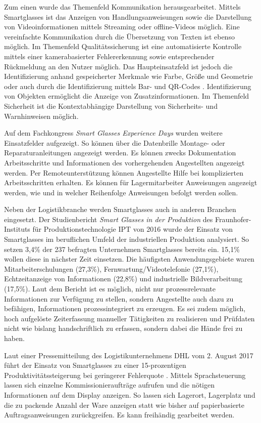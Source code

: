 Zum einen wurde das Themenfeld Kommunikation herausgearbeitet. Mittels Smartglasses ist das Anzeigen von Handlungsanweisungen sowie die Darstellung von Videoinformationen mittels Streaming oder offline-Videos möglich. Eine vereinfachte Kommunikation durch die Übersetzung von Texten ist ebenso möglich. Im Themenfeld Qualitätssicherung ist eine automatisierte Kontrolle mittels einer kamerabasierter Fehlererkennung sowie entsprechender Rückmeldung an den Nutzer möglich. Das Haupteinsatzfeld ist jedoch die Identifizierung anhand gespeicherter Merkmale wie Farbe, Größe und Geometrie oder auch durch die Identifizierung mittels Bar- und QR-Codes \cite{Niemoller2017}. Identifizierung von Objekten ermöglicht die Anzeige von Zusatzinformationen. Im Themenfeld Sicherheit ist die Kontextabhängige Darstellung von Sicherheits- und Warnhinweisen möglich. 

Auf dem Fachkongress \emph{Smart Glasses Experience Days} \cite{Manokaran-Pathamathan2017} wurden weitere Einsatzfelder aufgezeigt. So können über die Datenbrille Montage- oder Reparaturanleitungen angezeigt werden. Es können zwecks Dokumentation Arbeitsschritte und Informationen des vorhergehenden Angestellten angezeigt werden. Per Remoteunterstützung können Angestellte Hilfe bei komplizierten Arbeitsschritten erhalten. Es können für Lagermitarbeiter Anweisungen angezeigt werden, wie und in welcher Reihenfolge Anweisungen befolgt werden sollen.

Neben der Logistikbranche werden Smartglasses auch in anderen Branchen eingesetzt. Der Studienbericht \emph{Smart Glasses in der Produktion} des Fraunhofer-Instituts für Produktionstechnologie IPT von 2016 \cite{Plutz} wurde der Einsatz von Smartglasses im beruflichen Umfeld der industriellen Produktion analysiert. So setzen 3,4\% der 237 befragten Unternehmen  Smartglasses bereits ein. 15,1\% wollen diese in nächster Zeit einsetzen. Die häufigsten Anwendungsgebiete waren Mitarbeiterschulungen (27,3\%), Fernwartung/Videotelefonie (27,1\%), Echtzeitanzeige von Informationen (22,8\%) und industrielle Bildverarbeitung (17,5\%). Laut dem Bericht ist es möglich, nicht nur 
prozessrelevante Informationen zur Verfügung zu stellen, sondern Angestellte auch dazu zu befähigen, Informationen prozessintegriert zu erzeugen. Es sei zudem möglich, hoch aufgelöste Zeiterfassung manueller Tätigkeiten zu realisieren und Prüfdaten nicht wie bislang handschriftlich zu erfassen, sondern dabei die Hände frei zu haben.

Laut einer Pressemitteilung des Logistikunternehmens DHL vom 2. August 2017 führt der Einsatz von Smartglasses zu einer 15-prozentigen Produktivitätssteigerung bei geringerer Fehlerquote \cite{DeutschePostDHLGroup2017}. Mittels Sprachsteuerung lassen sich einzelne Kommissionieraufträge aufrufen und die nötigen Informationen auf dem Display anzeigen. So lassen sich Lagerort, Lagerplatz und die zu packende Anzahl der Ware anzeigen statt wie bisher auf papierbasierte Auftragsanweisungen zurückgreifen. Es kann freihändig gearbeitet werden.

